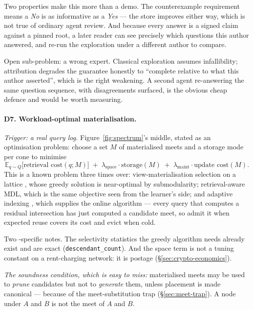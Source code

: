 Two properties make this more than a demo. The counterexample requirement
means a \emph{No} is as informative as a \emph{Yes} --- the store improves
either way, which is not true of ordinary agent review. And because every
answer is a signed claim against a pinned root, a later reader can see
precisely which questions this author answered, and re-run the exploration
under a different author to compare.

Open sub-problem: a wrong expert. Classical exploration assumes infallibility;
attribution degrades the guarantee honestly to ``complete relative to what
this author asserted'', which is the right weakening. A second agent
re-answering the same question sequence, with disagreements surfaced, is the
obvious cheap defence and would be worth measuring.

\paragraph{D7. Workload-optimal materialisation.}
\label{sec:dir-materialisation}
\emph{Trigger: a real query log.} Figure~\ref{fig:spectrum}'s middle, stated
as an optimisation problem: choose a set $M$ of materialised meets and a
storage mode per cone to minimise
\[
  \mathbb{E}_{q \sim Q}\bigl[\text{retrieval cost}(q; M)\bigr]
  \;+\; \lambda_{\text{space}}\cdot \text{storage}(M)
  \;+\; \lambda_{\text{maint}}\cdot \text{update cost}(M).
\]
This is a known problem three times over: view-materialisation selection on a
lattice \citep{harinarayan1996}, whose greedy solution is near-optimal by
submodularity; retrieval-aware MDL, which is the same objective seen from the
learner's side; and adaptive indexing \citep{idreos2007}, which supplies the
online algorithm --- every query that computes a residual intersection has
just computed a candidate meet, so admit it when expected reuse covers its
cost and evict when cold.

Two \odag{}-specific notes. The selectivity statistics the greedy algorithm
needs already exist and are exact (\verb|descendant_count|). And the space
term is not a tuning constant on a rent-charging network: it is postage
(\S\ref{sec:crypto-economics}).

\emph{The soundness condition, which is easy to miss:} materialised meets may
be used to \emph{prune} candidates but not to \emph{generate} them, unless
placement is made canonical --- because of the meet-substitution trap
(\S\ref{sec:meet-trap}). A node under $A$ and $B$ is not the meet of $A$ and
$B$.

